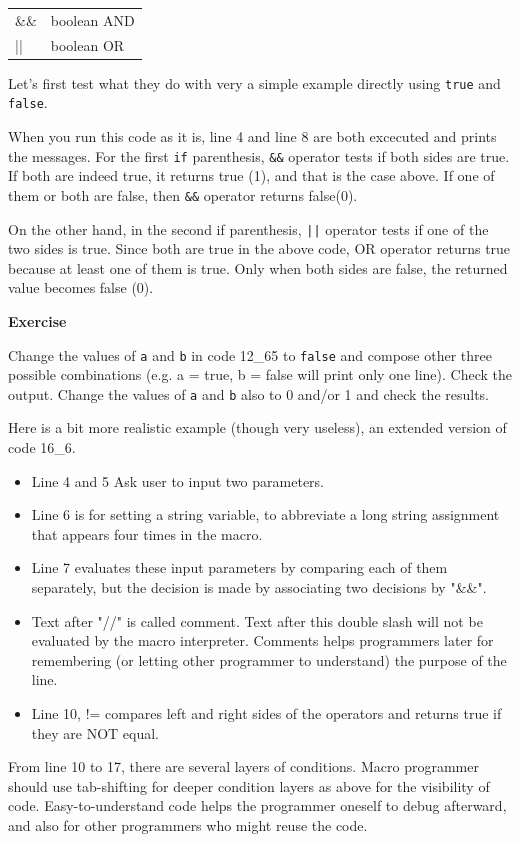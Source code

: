 \documentclass[11pt,a4paper,oneside]{report}
\newenvironment{indentexercise}[1]%
{{\setlength{\leftmargin}{2em}}%
\textbf{Exercise \thesubsection-#1}%
\begin{list}{}%
	\item%
}
{\end{list}}
\newenvironment{indentCom}%
{\begin{list}{}%
         {\setlength{\leftmargin}{1em}}%
         \item[]%
}
{\end{list}}
\newcommand{\ilcom}[1]{\texttt{\small#1}}
\begin{document}
\begin{indentCom}
 \begin{tabular*}{0.5\textwidth}{ l l }
\&\& & boolean AND\\
|| & boolean OR\\
\end{tabular*}
\end{indentCom}

Let's first test what they do with very a simple example directly using
\ilcom{true} and \ilcom{false}.

When you run this code as it is, line 4 and line 8 are both excecuted and prints
the messages. For the first \ilcom{if} parenthesis, \ilcom{\&\&} operator tests if
both sides are true. If both are indeed true, it returns true (1), and that is
the case above. If one of them or both are false, then \ilcom{\&\&}
operator returns false(0). 

On the other hand, in the second if parenthesis,
\ilcom{||} operator tests if one of the two sides is true. Since both are
true in the above code, OR operator returns true because at least one of them is
true. Only when both sides are false, the returned value becomes false (0).

\begin{indentexercise}{1}
Change the values of \ilcom{a} and \ilcom{b} in code 12\_65 to \ilcom{false} and
compose other three possible combinations (e.g. a = true, b = false will print
only one line).
Check the output. Change the values of \ilcom{a} and \ilcom{b} also to 0 and/or
1 and check the results. 
\end{indentexercise}

Here is a bit more realistic example (though very useless), an extended version
of code 16\_6.

\begin{itemize}
\item Line 4 and 5 Ask user to input two parameters.
\item Line 6 is for setting a string variable, to abbreviate a long string assignment that appears four times in the macro.
\item Line 7 evaluates these input parameters by comparing each of them separately, but the decision is made by associating two decisions by "\&\&". 
\item Text after "//" is called comment. Text after this double slash will not be evaluated by the macro interpreter. Comments helps programmers later for remembering (or letting other programmer to understand) the purpose of the line. 
\item Line 10, != compares left and right sides of the operators and returns true if they are NOT equal.   
\end{itemize}
From line 10 to 17, there are several layers of conditions. Macro programmer should use tab-shifting for deeper condition layers as above for the visibility of code. Easy-to-understand code helps the programmer oneself to debug afterward, and also for other programmers who might reuse the code.
\end{document}
